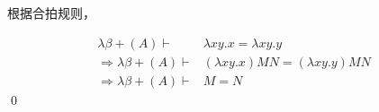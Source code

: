 \begin{pf} \rm 
    根据合拍规则，
    
$$
\begin{aligned}
    \lambda\beta+(A)\vdash&\lambda xy.x = \lambda xy.y \\
    \Rightarrow \lambda\beta+(A)\vdash&(\lambda xy.x) M N = (\lambda xy.y) M N \\
    \Rightarrow \lambda\beta+(A)\vdash& M = N
\end{aligned}
$$
    \qed 
\end{pf}